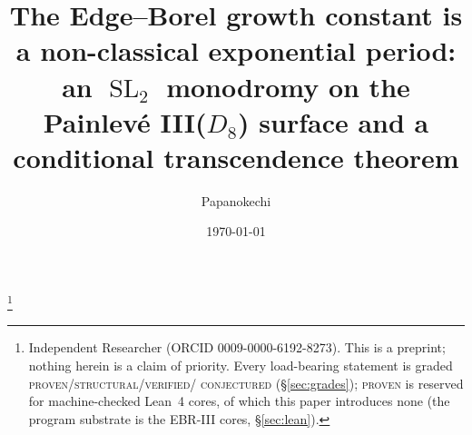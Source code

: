 \documentclass[11pt,reqno]{amsart}
\theoremstyle{plain}
\theoremstyle{definition}
\theoremstyle{remark}
\newcommand{\SL}{\operatorname{SL}}
\begin{document}
\title[The EBR growth constant is a non-classical exponential period]{The
Edge--Borel growth constant is a non-classical exponential period: an $\SL_{2}$
monodromy on the Painlev\'e III($D_{8}$) surface and a conditional
transcendence theorem}

\author{Papanokechi}
\thanks{Independent Researcher (ORCID 0009-0000-6192-8273). This is a
preprint; nothing herein is a claim of priority. Every load-bearing statement
is graded \textsc{proven}/\textsc{structural}/\textsc{verified}/%
\textsc{conjectured} (\S\ref{sec:grades}); \textsc{proven} is reserved for
machine-checked Lean~4 cores, of which this paper introduces none (the program
substrate is the EBR-III cores, \S\ref{sec:lean}).}

\date{\today}


\end{document}
